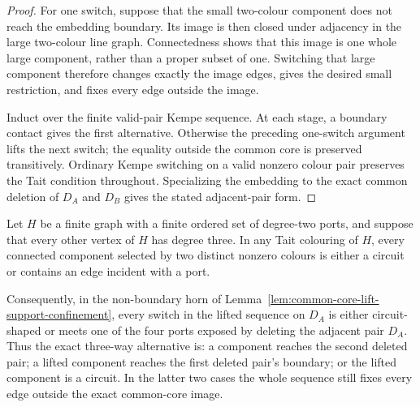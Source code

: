 \begin{proof}
For one switch, suppose that the small two-colour component does not reach
the embedding boundary.  Its image is then closed under adjacency in the
large two-colour line graph.  Connectedness shows that this image is one
whole large component, rather than a proper subset of one.  Switching that
large component therefore changes exactly the image edges, gives the desired
small restriction, and fixes every edge outside the image.

Induct over the finite valid-pair Kempe sequence.  At each stage, a boundary
contact gives the first alternative.  Otherwise the preceding one-switch
argument lifts the next switch; the equality outside the common core is
preserved transitively.  Ordinary Kempe switching on a valid nonzero colour
pair preserves the Tait condition throughout.  Specializing the embedding to
the exact common deletion of $D_A$ and $D_B$ gives the stated adjacent-pair
form.
\end{proof}

\begin{lemma}
\label{lem:confined-lift-port-or-circuit}
Let $H$ be a finite graph with a finite ordered set of degree-two ports,
and suppose that every other vertex of $H$ has degree three.  In any Tait
colouring of $H$, every connected component selected by two distinct
nonzero colours is either a circuit or contains an edge incident with a
port.

Consequently, in the non-boundary horn of
Lemma~\ref{lem:common-core-lift-support-confinement}, every switch in the
lifted sequence on $D_A$ is either circuit-shaped or meets one of the four
ports exposed by deleting the adjacent pair $D_A$.  Thus the exact
three-way alternative is: a component reaches the second deleted pair; a
lifted component reaches the first deleted pair's boundary; or the lifted
component is a circuit.  In the latter two cases the whole sequence still
fixes every edge outside the exact common-core image.
\end{lemma}

